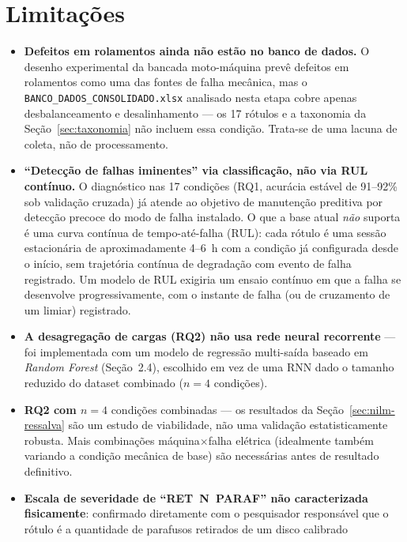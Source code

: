 \documentclass[12pt,a4paper]{report}
\begin{document}
\chapter{Limitações}
\label{ch:limitacoes}

\begin{itemize}
\item \textbf{Defeitos em rolamentos ainda não estão no banco de dados.} O
desenho experimental da bancada moto-máquina prevê defeitos em rolamentos
como uma das fontes de falha mecânica, mas o
\texttt{BANCO\_DADOS\_CONSOLIDADO.xlsx} analisado nesta etapa cobre apenas
desbalanceamento e desalinhamento — os 17 rótulos e a taxonomia da
Seção~\ref{sec:taxonomia} não incluem essa condição. Trata-se de uma lacuna
de coleta, não de processamento.
\item \textbf{``Detecção de falhas iminentes'' via classificação, não via
RUL contínuo.} O diagnóstico nas 17 condições (RQ1, acurácia estável de
91--92\% sob validação cruzada) já atende ao objetivo de manutenção
preditiva por detecção precoce do modo de falha instalado. O que a base
atual \emph{não} suporta é uma curva contínua de tempo-até-falha (RUL): cada
rótulo é uma sessão estacionária de aproximadamente 4--6~h com a condição já
configurada desde o início, sem trajetória contínua de degradação com evento
de falha registrado. Um modelo de RUL exigiria um ensaio contínuo em que a
falha se desenvolve progressivamente, com o instante de falha (ou de
cruzamento de um limiar) registrado.
\item \textbf{A desagregação de cargas (RQ2) não usa rede neural
recorrente} — foi implementada com um modelo de regressão multi-saída
baseado em \emph{Random Forest} (Seção~2.4), escolhido em vez de uma RNN
dado o tamanho reduzido do dataset combinado ($n=4$ condições).
\item \textbf{RQ2 com $n=4$} condições combinadas — os resultados da
Seção~\ref{sec:nilm-ressalva} são um estudo de viabilidade, não uma validação
estatisticamente robusta. Mais combinações máquina$\times$falha elétrica
(idealmente também variando a condição mecânica de base) são necessárias
antes de resultado definitivo.
\item \textbf{Escala de severidade de ``RET~N~PARAF'' não caracterizada
fisicamente}: confirmado diretamente com o pesquisador responsável que o
rótulo é a quantidade de parafusos retirados de um disco calibrado

\end{itemize}
\end{document}
